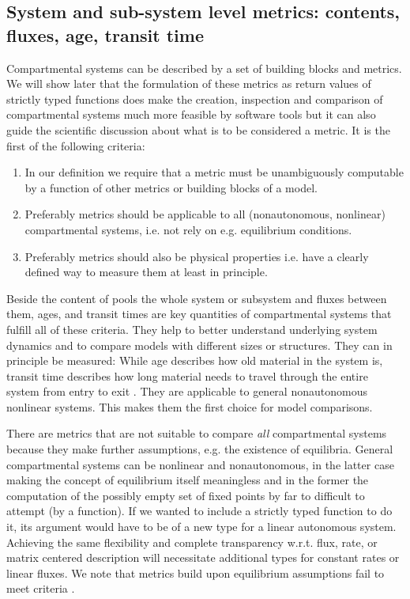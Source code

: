 \subsection{System and sub-system level metrics: contents, fluxes, age, transit time}
Compartmental systems can be described by a set of building blocks and metrics. 
We will show later that the formulation of these metrics as return values of
strictly typed functions does make the creation, inspection and
comparison of compartmental systems much more feasible by software tools  
but it can also guide the scientific discussion about what is to be considered a metric.
It is the first of the following criteria:
\begin{enumerate}
  \item
    \label{enum:function}
    In our definition we require that a metric must be unambiguously computable by a function of other metrics or building blocks of a model. 
  \item
    \label{enum:general}
    Preferably metrics should be applicable to all (nonautonomous, nonlinear) compartmental systems, i.e. not rely on e.g. equilibrium conditions.
  \item
    \label{enum:measurable}
  Preferably metrics should also be physical properties
  i.e. have a clearly defined way to measure them at least in principle.
\end{enumerate}

Beside the content of pools the whole system or subsystem and fluxes between
them, ages, and transit times are key quantities of compartmental systems that
fulfill all of these criteria.%
They help to better understand underlying system dynamics and to compare models
with different sizes or structures.  They can in principle be measured: While
age describes how old material in the system is, transit time describes how
long material needs to travel through the entire system from entry to exit
\citep{bolin1973Tellus, Sierra2017GCB}.  They are applicable to general
nonautonomous nonlinear systems.  This makes them the first choice for model
comparisons. 

There are metrics that are not suitable to compare \emph{all} compartmental systems because they make further assumptions, e.g. the existence of equilibria. 
General compartmental systems can be nonlinear and nonautonomous, in the latter case making the concept of equilibrium itself meaningless and in the former the computation of the possibly empty set of fixed points by far to difficult to attempt (by a function).
If we wanted to include a strictly typed function to do it, its argument would
have to be of a new type for a linear autonomous system.  Achieving the same flexibility
and complete transparency w.r.t. flux, rate, or matrix centered description
will necessitate additional types for constant rates or linear fluxes.
We note that metrics build upon equilibrium assumptions fail to meet criteria .

